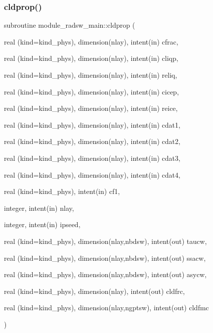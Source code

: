 \subsubsection{\texorpdfstring{cldprop()}{cldprop()}}
{\footnotesize\ttfamily subroutine module\+\_\+radsw\+\_\+main\+::cldprop (\begin{DoxyParamCaption}\item[{real (kind=kind\+\_\+phys), dimension(nlay), intent(in)}]{cfrac,  }\item[{real (kind=kind\+\_\+phys), dimension(nlay), intent(in)}]{cliqp,  }\item[{real (kind=kind\+\_\+phys), dimension(nlay), intent(in)}]{reliq,  }\item[{real (kind=kind\+\_\+phys), dimension(nlay), intent(in)}]{cicep,  }\item[{real (kind=kind\+\_\+phys), dimension(nlay), intent(in)}]{reice,  }\item[{real (kind=kind\+\_\+phys), dimension(nlay), intent(in)}]{cdat1,  }\item[{real (kind=kind\+\_\+phys), dimension(nlay), intent(in)}]{cdat2,  }\item[{real (kind=kind\+\_\+phys), dimension(nlay), intent(in)}]{cdat3,  }\item[{real (kind=kind\+\_\+phys), dimension(nlay), intent(in)}]{cdat4,  }\item[{real (kind=kind\+\_\+phys), intent(in)}]{cf1,  }\item[{integer, intent(in)}]{nlay,  }\item[{integer, intent(in)}]{ipseed,  }\item[{real (kind=kind\+\_\+phys), dimension(nlay,nbdsw), intent(out)}]{taucw,  }\item[{real (kind=kind\+\_\+phys), dimension(nlay,nbdsw), intent(out)}]{ssacw,  }\item[{real (kind=kind\+\_\+phys), dimension(nlay,nbdsw), intent(out)}]{asycw,  }\item[{real (kind=kind\+\_\+phys), dimension(nlay), intent(out)}]{cldfrc,  }\item[{real (kind=kind\+\_\+phys), dimension(nlay,ngptsw), intent(out)}]{cldfmc }\end{DoxyParamCaption})\hspace{0.3cm}{\ttfamily [private]}}


